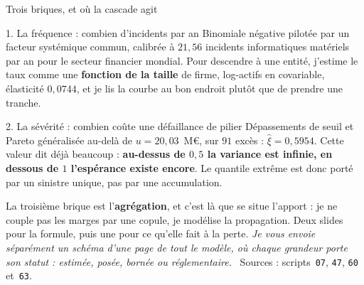 \documentclass[11pt]{beamer}
\begin{document}
\begin{frame}{Trois briques, et où la cascade agit}
\scriptsize
\begin{block}{1. La fréquence : combien d'incidents par an}
Binomiale négative pilotée par un facteur systémique commun, calibrée à $21{,}56$ incidents
informatiques matériels par an pour le secteur financier mondial. Pour descendre à une entité,
j'estime le taux comme une \textbf{fonction de la taille} de firme, log-actifs en covariable,
élasticité $0{,}0744$, et je lis la courbe au bon endroit plutôt que de prendre une tranche.
\end{block}
\vspace{-1mm}
\begin{block}{2. La sévérité : combien coûte une défaillance de pilier}
Dépassements de seuil et Pareto généralisée au-delà de $u = 20{,}03$~M\euro, sur $91$ excès :
$\hat\xi = 0{,}5954$. Cette valeur dit déjà beaucoup : \textbf{au-dessus de $0{,}5$ la variance
est infinie, en dessous de $1$ l'espérance existe encore}. Le quantile extrême est donc porté par
un sinistre unique, pas par une accumulation.
\end{block}
\vspace{-1mm}
{\scriptsize La troisième brique est l'\textbf{agrégation}, et c'est là que se situe l'apport :
je ne couple pas les marges par une copule, je modélise la propagation. Deux slides pour la
formule, puis une pour ce qu'elle fait à la perte. \emph{Je vous envoie séparément un schéma
d'une page de tout le modèle, où chaque grandeur porte son statut : estimée, posée, bornée ou
réglementaire.}
\ Sources : scripts~\texttt{07}, \texttt{47}, \texttt{60} et~\texttt{63}.}
\end{frame}
\end{document}
